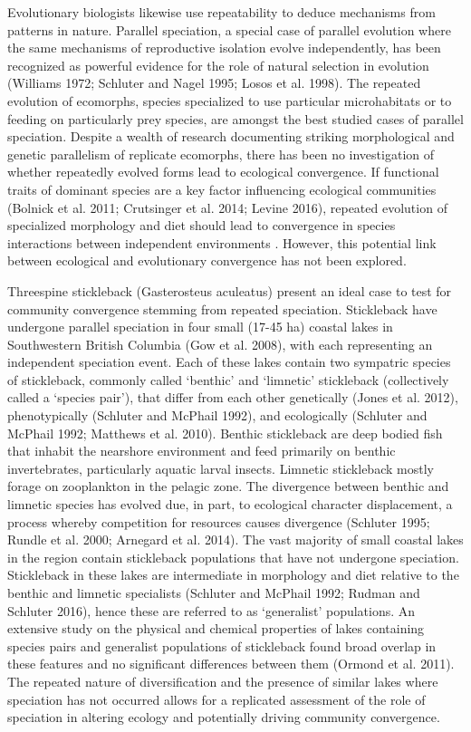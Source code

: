 \documentclass[11pt]{article}
\begin{document}
Evolutionary biologists likewise use repeatability to deduce mechanisms from patterns in nature.  Parallel speciation, a special case of parallel evolution where the same mechanisms of reproductive isolation evolve independently, has been recognized as powerful evidence for the role of natural selection in evolution (Williams 1972; Schluter and Nagel 1995; Losos et al. 1998).  The repeated evolution of ecomorphs, species specialized to use particular microhabitats or to feeding on particularly prey species, are amongst the best studied cases of parallel speciation.  Despite a wealth of research documenting striking morphological and genetic parallelism of replicate ecomorphs, there has been no investigation of whether repeatedly evolved forms lead to ecological convergence.  If functional traits of dominant species are a key factor influencing ecological communities (Bolnick et al. 2011; Crutsinger et al. 2014; Levine 2016), repeated evolution of specialized morphology and diet should lead to convergence in species interactions between independent environments .  However, this potential link between ecological and evolutionary convergence has not been explored.  

Threespine stickleback (Gasterosteus aculeatus) present an ideal case to test for community convergence stemming from repeated speciation.  Stickleback have undergone parallel speciation in four small (17-45 ha) coastal lakes in Southwestern British Columbia (Gow et al. 2008), with each representing an independent speciation event.  Each of these lakes contain two sympatric species of stickleback, commonly called ‘benthic’ and ‘limnetic’ stickleback (collectively called a ‘species pair’), that differ from each other genetically (Jones et al. 2012), phenotypically (Schluter and McPhail 1992), and ecologically (Schluter and McPhail 1992; Matthews et al. 2010).  Benthic stickleback are deep bodied fish that inhabit the nearshore environment and feed primarily on benthic invertebrates, particularly aquatic larval insects.  Limnetic stickleback mostly forage on zooplankton in the pelagic zone.  The divergence between benthic and limnetic species has evolved due, in part, to ecological character displacement, a process whereby competition for resources causes divergence (Schluter 1995; Rundle et al. 2000; Arnegard et al. 2014).   The vast majority of small coastal lakes in the region contain stickleback populations that have not undergone speciation.  Stickleback in these lakes are intermediate in morphology and diet relative to the benthic and limnetic specialists (Schluter and McPhail 1992; Rudman and Schluter 2016), hence these are referred to as ‘generalist’ populations.  An extensive study on the physical and chemical properties of lakes containing species pairs and generalist populations of stickleback found broad overlap in these features and no significant differences between them (Ormond et al. 2011). The repeated nature of diversification and the presence of similar lakes where speciation has not occurred allows for a replicated assessment of the role of speciation in altering ecology and potentially driving community convergence.  
\end{document}
